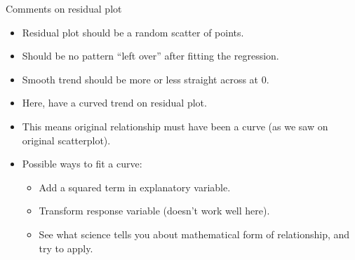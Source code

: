\documentclass[ignorenonframetext,]{beamer}
\providecommand{\tightlist}{%
  \setlength{\itemsep}{0pt}\setlength{\parskip}{0pt}}
\begin{document}
\begin{frame}{Comments on residual plot}
\protect\hypertarget{comments-on-residual-plot}{}

\begin{itemize}
\tightlist
\item
  Residual plot should be a random scatter of points.
\item
  Should be no pattern ``left over'' after fitting the regression.
\item
  Smooth trend should be more or less straight across at 0.
\item
  Here, have a curved trend on residual plot.
\item
  This means original relationship must have been a curve (as we saw on
  original scatterplot).
\item
  Possible ways to fit a curve:

  \begin{itemize}
  \tightlist
  \item
    Add a squared term in explanatory variable.
  \item
    Transform response variable (doesn't work well here).
  \item
    See what science tells you about mathematical form of relationship,
    and try to apply.
  \end{itemize}
\end{itemize}

\end{frame}
\end{document}
